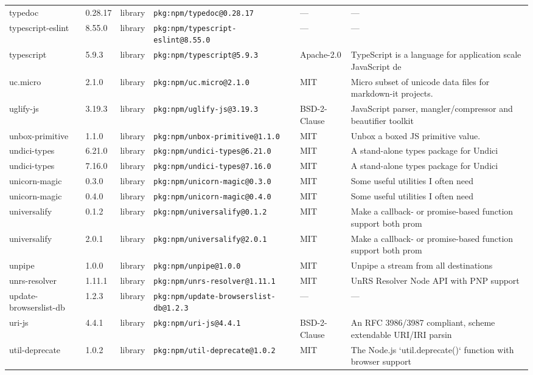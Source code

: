 \documentclass[11pt]{article}
\begin{document}
\begin{longtable}{|l|l|l|p{2.2cm}|l|p{4cm}|}
typedoc & 0.28.17 & library & \texttt{pkg:npm/typedoc@0.28.17} & — & — \\
typescript-eslint & 8.55.0 & library & \texttt{pkg:npm/typescript-eslint@8.55.0} & — & — \\
typescript & 5.9.3 & library & \texttt{pkg:npm/typescript@5.9.3} & Apache-2.0 & TypeScript is a language for application scale JavaScript de \\
uc.micro & 2.1.0 & library & \texttt{pkg:npm/uc.micro@2.1.0} & MIT & Micro subset of unicode data files for markdown-it projects. \\
uglify-js & 3.19.3 & library & \texttt{pkg:npm/uglify-js@3.19.3} & BSD-2-Clause & JavaScript parser, mangler/compressor and beautifier toolkit \\
unbox-primitive & 1.1.0 & library & \texttt{pkg:npm/unbox-primitive@1.1.0} & MIT & Unbox a boxed JS primitive value. \\
undici-types & 6.21.0 & library & \texttt{pkg:npm/undici-types@6.21.0} & MIT & A stand-alone types package for Undici \\
undici-types & 7.16.0 & library & \texttt{pkg:npm/undici-types@7.16.0} & MIT & A stand-alone types package for Undici \\
unicorn-magic & 0.3.0 & library & \texttt{pkg:npm/unicorn-magic@0.3.0} & MIT & Some useful utilities I often need \\
unicorn-magic & 0.4.0 & library & \texttt{pkg:npm/unicorn-magic@0.4.0} & MIT & Some useful utilities I often need \\
universalify & 0.1.2 & library & \texttt{pkg:npm/universalify@0.1.2} & MIT & Make a callback- or promise-based function support both prom \\
universalify & 2.0.1 & library & \texttt{pkg:npm/universalify@2.0.1} & MIT & Make a callback- or promise-based function support both prom \\
unpipe & 1.0.0 & library & \texttt{pkg:npm/unpipe@1.0.0} & MIT & Unpipe a stream from all destinations \\
unrs-resolver & 1.11.1 & library & \texttt{pkg:npm/unrs-resolver@1.11.1} & MIT & UnRS Resolver Node API with PNP support \\
update-browserslist-db & 1.2.3 & library & \texttt{pkg:npm/update-browserslist-db@1.2.3} & — & — \\
uri-js & 4.4.1 & library & \texttt{pkg:npm/uri-js@4.4.1} & BSD-2-Clause & An RFC 3986/3987 compliant, scheme extendable URI/IRI parsin \\
util-deprecate & 1.0.2 & library & \texttt{pkg:npm/util-deprecate@1.0.2} & MIT & The Node.js `util.deprecate()` function with browser support \\

\end{longtable}
\end{document}
